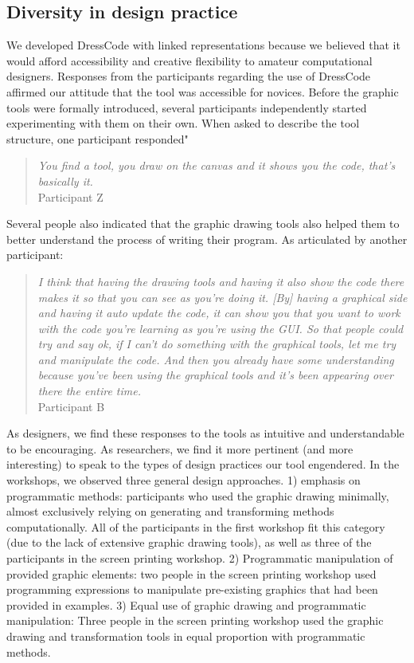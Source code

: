 \documentclass{sigchi}
\begin{document}
\subsection{Diversity in design practice}
We developed DressCode with linked representations because we believed that it would afford accessibility and creative flexibility to amateur computational designers. Responses from the participants regarding the use of DressCode affirmed our attitude that the tool was accessible for novices. Before the graphic tools were formally introduced, several participants independently started experimenting with them on their own.  When asked to describe the tool structure, one participant responded"
\begin{quotation}
\textit{You find a tool, you draw on the canvas and it shows you the code, that's basically it.}
\\Participant Z
\end{quotation}
Several people also indicated that the graphic drawing tools also helped them to better understand the process of writing their program. As articulated by another participant:
\begin{quotation}
\textit{I think that having the drawing tools and having it also show the code there makes it so that you can see as you're doing it. [By] having a graphical side and having it auto update the code, it can show you that you want to work with the code you're learning as you're using the GUI. So that people could try and say ok, if I can't do something with the graphical tools, let me try and manipulate the code. And then you already have some understanding because you've been using the graphical tools and it's been appearing over there the entire time.}
\\Participant B
\end{quotation}
As designers, we find these responses to the tools as intuitive and understandable to be encouraging. As researchers, we find it more pertinent (and more interesting) to speak to the types of design practices our tool engendered. In the workshops, we observed three general design approaches. 1) emphasis on programmatic methods: participants who used the graphic drawing minimally, almost exclusively relying on generating and transforming methods computationally. All of the participants in the first workshop fit this category (due to the lack of extensive graphic drawing tools), as well as three of the participants in the screen printing workshop. 2) Programmatic manipulation of provided graphic elements: two people in the screen printing workshop used programming expressions to manipulate pre-existing graphics that had been provided in examples. 3) Equal use of graphic drawing and programmatic manipulation: Three people in the screen printing workshop used the graphic drawing and transformation tools in equal proportion with programmatic methods.
\end{document}
